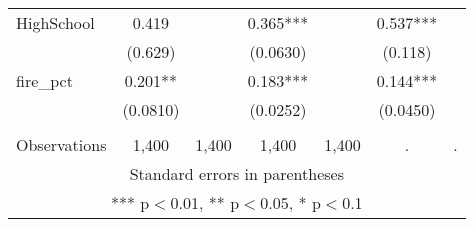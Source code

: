 \begin{tabular}{lcccccc}
HighSchool & 0.419 &  & 0.365*** &  & 0.537*** &  \\
 & (0.629) &  & (0.0630) &  & (0.118) &  \\
fire\_pct & 0.201** &  & 0.183*** &  & 0.144*** &  \\
 & (0.0810) &  & (0.0252) &  & (0.0450) &  \\
 &  &  &  &  &  &  \\
 Observations & 1,400 & 1,400 & 1,400 & 1,400 & . & . \\ \hline
\multicolumn{7}{c}{ Standard errors in parentheses} \\
\multicolumn{7}{c}{ *** p$<$0.01, ** p$<$0.05, * p$<$0.1} \\
\end{tabular}
